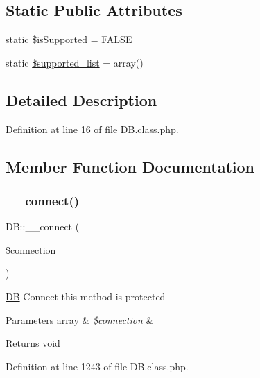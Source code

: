 \subsection*{Static Public Attributes}
\begin{DoxyCompactItemize}
\item 
static \hyperlink{classDB_a6b693edbdcdce5c86f42c050f62d8136}{\$is\+Supported} = F\+A\+L\+SE
\item 
static \hyperlink{classDB_ac09dd547a22963632e063c9ab68b7707}{\$supported\+\_\+list} = array()
\end{DoxyCompactItemize}


\subsection{Detailed Description}


Definition at line 16 of file D\+B.\+class.\+php.



\subsection{Member Function Documentation}
\hypertarget{classDB_a398b5d8142cab5920d3e037b4f22830e}{}\label{classDB_a398b5d8142cab5920d3e037b4f22830e} 
\subsubsection{\texorpdfstring{\+\_\+\+\_\+connect()}{\_\_connect()}}
{\footnotesize\ttfamily D\+B\+::\+\_\+\+\_\+connect (\begin{DoxyParamCaption}\item[{}]{\$connection }\end{DoxyParamCaption})}

\hyperlink{classDB}{DB} Connect this method is protected 
\begin{DoxyParams}[1]{Parameters}
array & {\em \$connection} & \\
\hline
\end{DoxyParams}
\begin{DoxyReturn}{Returns}
void 
\end{DoxyReturn}


Definition at line 1243 of file D\+B.\+class.\+php.

\hypertarget{classDB_a9e93ad499d34fefc40686d35ed9bf18f}{}\label{classDB_a9e93ad499d34fefc40686d35ed9bf18f} 

